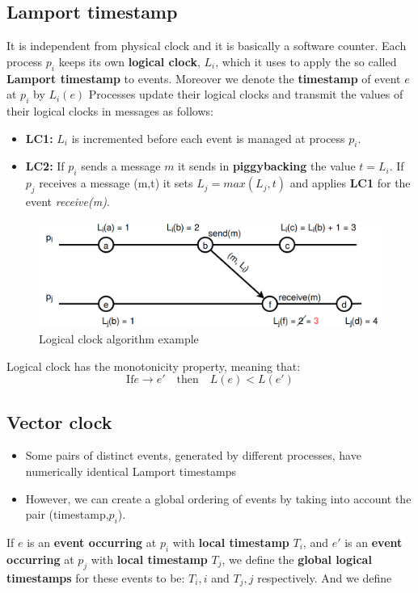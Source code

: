 \subsection{Lamport timestamp}
It is independent from physical clock and it is basically a software counter. Each process \(p_i\) keeps its own \textbf{logical clock}, \(L_i\), which it uses to apply the so called \textbf{Lamport timestamp} to events. Moreover we denote the \textbf{timestamp} of event \(e\) at \(p_i\) by \(L_i(e)\)
Processes update their logical clocks and transmit the values of their logical clocks in messages as follows:
\begin{itemize}
    \item \textbf{LC1:} \(L_i\) is incremented before each event is managed at process \(p_i\).
    \item \textbf{LC2:} If \(p_i\) sends a message \(m\) it sends in \textbf{piggybacking} the value \(t = L_i\). If \(p_j\) receives a message (m,t) it sets \(L_j = max(L_j,t)\) and applies \textbf{LC1} for the event \textit{receive(m)}.
\end{itemize}

\begin{figure}[!h]
    \centering
    \includegraphics[width=.60\linewidth]{images/Clock/logicalClock.png}
    \caption{Logical clock algorithm example}
\end{figure}
\newpage

Logical clock has the monotonicity property, meaning that:
\[\textrm{If} e \rightarrow e' \quad \textrm{then} \quad L(e)<L(e')\]

\subsection{Vector clock}
\begin{itemize}
    \item Some pairs of distinct events, generated by different processes, have numerically identical Lamport timestamps
    \item However, we can create a global ordering of events by taking into account the pair (timestamp,\(p_i\)).
\end{itemize}
If \(e\) is an \textbf{event occurring} at \(p_i\) with \textbf{local timestamp} \(T_i\), and \(e'\) is an \textbf{event occurring} at \(p_j\) with \textbf{local timestamp} \(T_j\), we define the \textbf{global logical timestamps} for these events to be: \(T_i, i\) and \(T_j, j\) respectively. And we define

